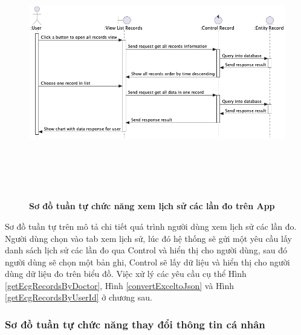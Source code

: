     \begin{figure}[H]
         \centering
         \includegraphics[width=16cm,height=11cm]{Images/mobile_app/view_record_timeline.png}
         \caption[Sơ đồ tuần tự chức năng xem lịch sử các lần đo trên App]{\bfseries \fontsize{12pt}{0pt}
         \selectfont Sơ đồ tuần tự chức năng xem lịch sử các lần đo trên App}
         \label{view_record_timeline} %
    \end{figure}

    Sơ đồ tuần tự trên mô tả chi tiết quá trình người dùng xem lịch sử các lần đo. Người dùng chọn vào tab xem lịch sử, 
    lúc đó hệ thống sẽ gửi một yêu cầu lấy danh sách lịch sử các lần đo qua Control và hiển thị cho người dùng, sau đó người dùng sẽ
    chọn một bản ghi, Control sẽ lấy dữ liệu và hiển thị cho người dùng dữ liệu đo trên biểu đồ. Việc xử lý các yêu cầu cụ thể
    Hình \ref{getEcgRecordsByDoctor}, Hình \ref{convertExceltoJson} và Hình \ref{getEcgRecordsByUserId} ở chương sau.

\subsubsection{Sơ đồ tuần tự chức năng thay đổi thông tin cá nhân}

